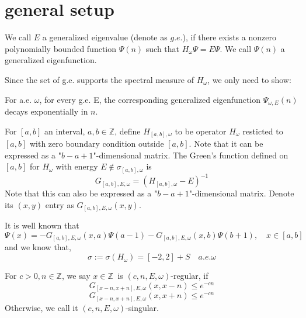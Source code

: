 \section{general setup}
\begin{definition}
    We call $E$ a generalized eigenvalue (denote as $g.e.$), if there exists a nonzero polynomially bounded function $\Psi(n)$ such that $H_\omega\Psi=E\Psi$. We call $\Psi(n)$ a generalized eigenfunction.
\end{definition}
Since the set of g.e. supports the spectral measure of $H_\omega$, we only need to show:
\begin{thm}\label{thm1}
  For a.e. $\omega$, for every g.e. E, the corresponding generalized eigenfunction $\Psi_{\omega,E}(n)$ decays exponentially in $n$.
\end{thm}

For $[a,b]$ an interval, $a,b\in\mathbb{Z}$, define $H_{[a,b],\omega}$ to be operator $H_\omega$ resticted to $[a,b]$ with zero boundary condition outside $[a,b]$. Note that it can be expressed as a "$b-a+1$"-dimensional matrix.
The Green's function defined on $[a,b]$ for $H_\omega$ with energy $E\notin\sigma_{[a,b],\omega}$ is
  \[
    G_{[a,b],E,\omega}=(H_{[a,b],\omega}-E)^{-1}
  \]
Note that this can also be expressed as a "$b-a+1$"-dimensional matrix. Denote its $(x,y)$ entry as $G_{[a,b],E,\omega}(x,y)$.

It is well known that
  \begin{equation}\label{possion}
    \Psi(x)=-G_{[a,b],E,\omega}(x,a)\Psi(a-1)-G_{[a,b],E,\omega}(x,b)\Psi(b+1),\quad x\in[a,b]
  \end{equation}
and we know that,
\begin{equation}\label{sigma}
\sigma:=\sigma(H_{\omega})=[-2,2]+S\quad a.e.\omega
\end{equation}



\begin{definition}
   For $c>0, n\in\mathbb{Z}$, we say $x\in\mathbb{Z}~$ is $(c,n,E,\omega)$-regular, if
  \[
    G_{[x-n,x+n],E,\omega}(x,x-n) \leq e^{-cn}
  \]
  \[
    G_{[x-n,x+n],E,\omega}(x,x+n) \leq e^{-cn}
  \]
  Otherwise, we call it $(c,n,E,\omega)$-singular.
\end{definition}

